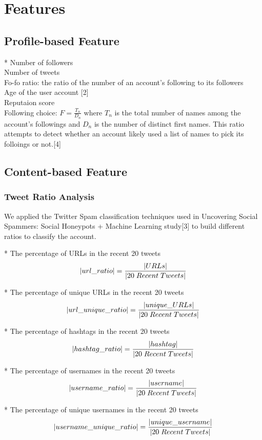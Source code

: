 \documentclass[a4paper, twoside, 12pt]{report}
\DeclarePairedDelimiter\abs{\lvert}{\rvert}%
\begin{document}
\section{Features}
\subsection{Profile-based Feature}
* Number of followers\\
\noindent* Number of tweets\\
\noindent* Fo-fo ratio: the ratio of the number of an account's following to its followers\\
\noindent* Age of the user account [2]\\
\noindent* Reputaion score\\
\noindent* Following choice: $F=\frac{T_n}{D_n}$ where $T_n$ is the total number of names among the account's followings and $D_n$ is the number of distinct first names. This ratio attempts to detect whether an account likely used a list of names to pick its folloings or not.[4]


\subsection{Content-based Feature}
\subsubsection{Tweet Ratio Analysis}
We applied the Twitter Spam classification techniques used in Uncovering Social Spammers: Social Honeypots + Machine Learning study[3] to build different ratios to classify the account.

* The percentage of URLs in the recent 20 tweets
\[\abs{url\_ratio} = \dfrac{\abs{URLs}}{\abs{20 \; Recent \;Tweets}}\]

* The percentage of unique URLs in the recent 20 tweets
\[\abs{url\_unique\_ratio} = \dfrac{\abs{unique\_URLs}}{\abs{20 \; Recent \;Tweets}}\]

* The percentage of hashtags in the recent 20 tweets
\[\abs{hashtag\_ratio} = \dfrac{\abs{hashtag}}{\abs{20 \; Recent \;Tweets}}\]

* The percentage of usernames in the recent 20 tweets
\[\abs{username\_ratio} = \dfrac{\abs{username}}{\abs{20 \; Recent \;Tweets}}\]


* The percentage of unique usernames in the recent 20 tweets
\[\abs{username\_unique\_ratio} = \dfrac{\abs{unique\_username}}{\abs{20 \; Recent \;Tweets}}\]
\end{document}
